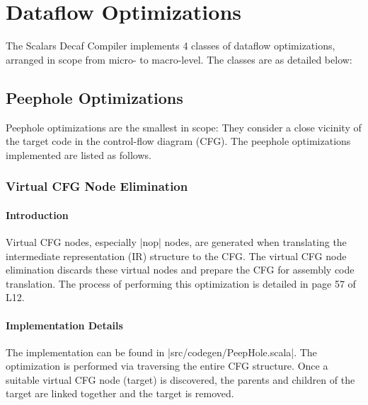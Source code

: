 \tableofcontents

\section{Dataflow Optimizations}

The Scalars Decaf Compiler implements 4 classes of dataflow optimizations, arranged in scope from micro- to macro-level. The classes are as detailed below:

\subsection{Peephole Optimizations}

Peephole optimizations are the smallest in scope: They consider a close vicinity of the target code in the control-flow diagram (CFG). The peephole optimizations implemented are listed as follows.

\subsubsection{Virtual CFG Node Elimination}

\paragraph{Introduction}

Virtual CFG nodes, especially |nop| nodes, are generated when translating the intermediate representation (IR) structure to the CFG. The virtual CFG node elimination discards these virtual nodes and prepare the CFG for assembly code translation. The process of performing this optimization is detailed in page 57 of L12.

\paragraph{Implementation Details}

The implementation can be found in |src/codegen/PeepHole.scala|. The optimization is performed via traversing the entire CFG structure. Once a suitable virtual CFG node (target) is discovered, the parents and children of the target are linked together and the target is removed.

